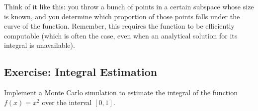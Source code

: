 \documentclass[letterpaper,10pt,english]{jupyterBook}
\begin{document}
\begin{sphinxShadowBox}
\sphinxstylesidebartitle{}

\sphinxAtStartPar
Think of it like this: you throw a bunch of points in a certain subspace whose size is known, and you determine which proportion of those points falls under the curve of the function. Remember, this requires the function to be efficiently computable (which is often the case, even when an analytical solution for its integral is unavailable).
\end{sphinxShadowBox}


\subsection{Exercise: Integral Estimation}
\label{\detokenize{01:exercise-integral-estimation}}
\sphinxAtStartPar
Implement a Monte Carlo simulation to estimate the integral of the function \(f(x) = x^2\) over the interval \([0, 1]\).
\end{document}
